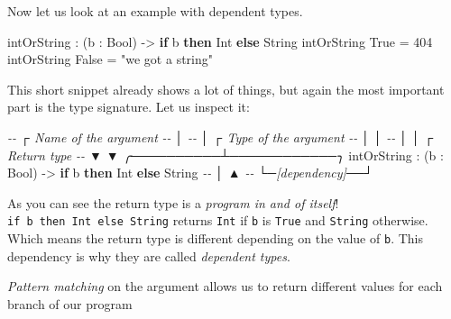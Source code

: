 \documentclass[
]{article}
\newenvironment{Shaded}{}{}
\newcommand{\CommentTok}[1]{\textcolor[rgb]{0.38,0.63,0.69}{\textit{#1}}}
\newcommand{\DataTypeTok}[1]{\textcolor[rgb]{0.56,0.13,0.00}{#1}}
\newcommand{\DecValTok}[1]{\textcolor[rgb]{0.25,0.63,0.44}{#1}}
\newcommand{\KeywordTok}[1]{\textcolor[rgb]{0.00,0.44,0.13}{\textbf{#1}}}
\newcommand{\NormalTok}[1]{#1}
\newcommand{\OperatorTok}[1]{\textcolor[rgb]{0.40,0.40,0.40}{#1}}
\newcommand{\OtherTok}[1]{\textcolor[rgb]{0.00,0.44,0.13}{#1}}
\newcommand{\StringTok}[1]{\textcolor[rgb]{0.25,0.44,0.63}{#1}}
\begin{document}
Now let us look at an example with dependent types.

\begin{Shaded}
\begin{Highlighting}[]
\NormalTok{intOrString }\OperatorTok{:}\NormalTok{ (b }\OperatorTok{:} \DataTypeTok{Bool}\NormalTok{) }\OtherTok{{-}\textgreater{}} \KeywordTok{if}\NormalTok{ b }\KeywordTok{then} \DataTypeTok{Int} \KeywordTok{else} \DataTypeTok{String}
\NormalTok{intOrString }\DataTypeTok{True} \OtherTok{=} \DecValTok{404}
\NormalTok{intOrString }\DataTypeTok{False} \OtherTok{=} \StringTok{"we got a string"}
\end{Highlighting}
\end{Shaded}

This short snippet already shows a lot of things, but again the most
important part is the type signature. Let us inspect it:

\begin{Shaded}
\begin{Highlighting}[]
\CommentTok{{-}{-}             ┌ Name of the argument}
\CommentTok{{-}{-}             │}
\CommentTok{{-}{-}             │    ┌ Type of the argument  }
\CommentTok{{-}{-}             │    │ }
\CommentTok{{-}{-}             │    │                  ┌ Return type}
\CommentTok{{-}{-}             ▼    ▼       ╭──────────┴────────────╮  }
\NormalTok{intOrString }\OperatorTok{:}\NormalTok{ (b }\OperatorTok{:} \DataTypeTok{Bool}\NormalTok{) }\OtherTok{{-}\textgreater{}} \KeywordTok{if}\NormalTok{ b }\KeywordTok{then} \DataTypeTok{Int} \KeywordTok{else} \DataTypeTok{String}
\CommentTok{{-}{-}             │               ▲}
\CommentTok{{-}{-}             └─[dependency]──┘}
\end{Highlighting}
\end{Shaded}

As you can see the return type is a \emph{program in and of itself}!
\texttt{if\ b\ then\ Int\ else\ String} returns \texttt{Int} if
\texttt{b} is \texttt{True} and \texttt{String} otherwise. Which means
the return type is different depending on the value of \texttt{b}. This
dependency is why they are called \emph{dependent types}.

\emph{Pattern matching} on the argument allows us to return different
values for each branch of our program
\end{document}
